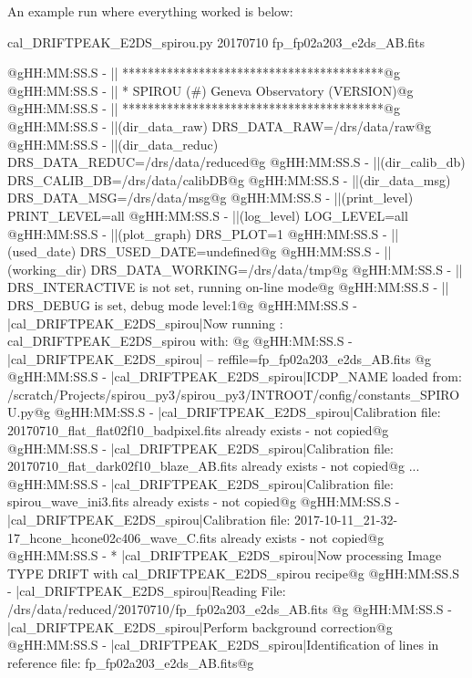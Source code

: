 An example run where everything worked is below:
\begin{cmdbox}[title={example}]
cal_DRIFTPEAK_E2DS_spirou.py 20170710 fp_fp02a203_e2ds_AB.fits
\end{cmdbox}
\begin{cmdboxprintspecial}[fontupper=\tiny, fontlower=\tiny]
@gHH:MM:SS.S -   || *****************************************@g
@gHH:MM:SS.S -   || * SPIROU \@(#) Geneva Observatory (VERSION)@g
@gHH:MM:SS.S -   || *****************************************@g
@gHH:MM:SS.S -   ||(dir_data_raw)      DRS_DATA_RAW=/drs/data/raw@g
@gHH:MM:SS.S -   ||(dir_data_reduc)    DRS_DATA_REDUC=/drs/data/reduced@g
@gHH:MM:SS.S -   ||(dir_calib_db)      DRS_CALIB_DB=/drs/data/calibDB@g
@gHH:MM:SS.S -   ||(dir_data_msg)      DRS_DATA_MSG=/drs/data/msg@g
@gHH:MM:SS.S -   ||(print_level)       PRINT_LEVEL=all         %
@gHH:MM:SS.S -   ||(log_level)         LOG_LEVEL=all         %
@gHH:MM:SS.S -   ||(plot_graph)        DRS_PLOT=1            %
@gHH:MM:SS.S -   ||(used_date)         DRS_USED_DATE=undefined@g
@gHH:MM:SS.S -   ||(working_dir)       DRS_DATA_WORKING=/drs/data/tmp@g
@gHH:MM:SS.S -   ||                    DRS_INTERACTIVE is not set, running on-line mode@g
@gHH:MM:SS.S -   ||                    DRS_DEBUG is set, debug mode level:1@g
@gHH:MM:SS.S -   |cal_DRIFTPEAK_E2DS_spirou|Now running : cal_DRIFTPEAK_E2DS_spirou with: @g
@gHH:MM:SS.S -   |cal_DRIFTPEAK_E2DS_spirou|       -- reffile=fp_fp02a203_e2ds_AB.fits @g
@gHH:MM:SS.S -   |cal_DRIFTPEAK_E2DS_spirou|ICDP_NAME loaded from: /scratch/Projects/spirou_py3/spirou_py3/INTROOT/config/constants_SPIROU.py@g
@gHH:MM:SS.S -   |cal_DRIFTPEAK_E2DS_spirou|Calibration file: 20170710_flat_flat02f10_badpixel.fits already exists - not copied@g
@gHH:MM:SS.S -   |cal_DRIFTPEAK_E2DS_spirou|Calibration file: 20170710_flat_dark02f10_blaze_AB.fits already exists - not copied@g
...
@gHH:MM:SS.S -   |cal_DRIFTPEAK_E2DS_spirou|Calibration file: spirou_wave_ini3.fits already exists - not copied@g
@gHH:MM:SS.S -   |cal_DRIFTPEAK_E2DS_spirou|Calibration file: 2017-10-11_21-32-17_hcone_hcone02c406_wave_C.fits already exists - not copied@g
@gHH:MM:SS.S - * |cal_DRIFTPEAK_E2DS_spirou|Now processing Image TYPE DRIFT with cal_DRIFTPEAK_E2DS_spirou recipe@g
@gHH:MM:SS.S -   |cal_DRIFTPEAK_E2DS_spirou|Reading File: /drs/data/reduced/20170710/fp_fp02a203_e2ds_AB.fits @g
@gHH:MM:SS.S -   |cal_DRIFTPEAK_E2DS_spirou|Perform background correction@g
@gHH:MM:SS.S -   |cal_DRIFTPEAK_E2DS_spirou|Identification of lines in reference file: fp_fp02a203_e2ds_AB.fits@g

\end{cmdboxprintspecial}
